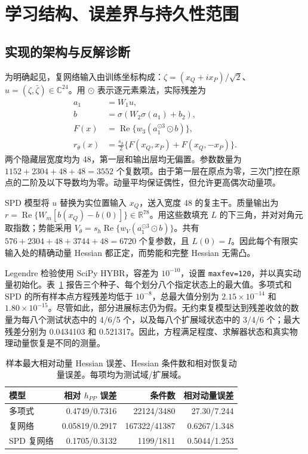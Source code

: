 \section{学习结构、误差界与持久性范围}
\label{supp:learning-kam}

\subsection{实现的架构与反解诊断}
为明确起见，复网络输入由训练坐标构成：$\zeta=(x_Q+ix_P)/\sqrt2$、$u=(\zeta,\bar\zeta)\in\mathbb C^{24}$。用 $\odot$ 表示逐元素乘法，实际残差为
\begin{equation}
 \begin{aligned}
 a_1&=W_1u,\\
 b&=\sigma(W_2\sigma(a_1)+b_2),\\
 F(x)&=\operatorname{Re}\{w_3(a_1^{\odot3}\odot b)\},\\
 r_\theta(x)&=\tfrac{s_h}{2}\{F(x_Q,x_P)+F(x_Q,-x_P)\}.
 \end{aligned}
 \label{eq:supp-learn-network}
\end{equation}
两个隐藏层宽度均为 48，第一层和输出层均无偏置。参数数量为 $1152+2304+48+48=3552$ 个复数项。由于第一层在原点为零，三次门控在原点的二阶及以下导数均为零。动量平均保证偶性，但允许更高偶次动量项。

SPD 模型将 $u$ 替换为实位置输入 $x_Q$，送入宽度 48 的复主干。质量输出为 $r=\operatorname{Re}\{W_m[b(x_Q)-b(0)]\}\in\mathbb R^{78}$。用这些数填充 $L$ 的下三角，并对对角元取指数；势能采用 $V_\theta=s_h\operatorname{Re}\{w_V(a_1^{\odot3}\odot b)\}$。共有 $576+2304+48+3744+48=6720$ 个复参数，且 $L(0)=I$。因此每个有限实输入处的精确动量 Hessian 都正定，而势能和完整 Hessian 无需凸。

Legendre 检验使用 SciPy HYBR，容差为 $10^{-10}$，设置 \texttt{maxfev=120}，并以真实动量初始化。表~\ref{tab:supp-learning-inverse} 报告三个种子、每个划分八个指定状态上的最大值。多项式和 SPD 的所有样本点方程残差均低于 $10^{-8}$，总最大值分别为 $2.15\times10^{-14}$ 和 $1.80\times10^{-15}$。尽管如此，部分进展标志仍为假。无约束复模型达到残差收敛的数量为每八个测试状态中的 4/6/5 个，以及每八个扩展域状态中的 3/4/6 个；最大残差分别为 0.0434103 和 0.521317。因此，方程满足程度、求解器状态和真实物理动量恢复是不同的测量。

\begin{table}[H]
\centering
\caption{样本最大相对动量 Hessian 误差、Hessian 条件数和相对恢复动量误差。每项均为测试域/扩展域。}
\label{tab:supp-learning-inverse}
\begin{tabular}{lrrr}
\toprule
模型 & 相对 $h_{PP}$ 误差 & 条件数 & 相对动量误差\\
\midrule
多项式 & 0.4749/0.7316 & 22124/3480 & 27.30/7.244\\
复网络 & 0.05819/0.2917 & 167322/41387 & 0.6267/1.348\\
SPD 复网络 & 0.1705/0.3132 & 1199/1811 & 0.5044/1.253\\
\bottomrule
\end{tabular}
\end{table}

